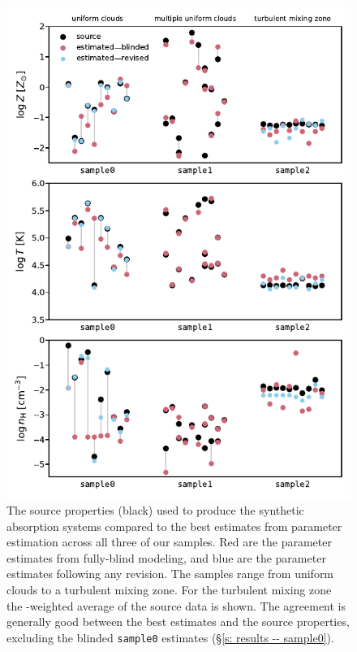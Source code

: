 \documentclass[fleqn,usenatbib]{mnras}
\begin{document}
\begin{figure}
    \centering
    \includegraphics[width=\columnwidth]{figures/averages.pdf}
    \caption{
    The source properties (black) used to produce the synthetic absorption systems
    compared to the best estimates from parameter estimation across all three of our samples.
    Red are the parameter estimates from fully-blind modeling,
    and blue are the parameter estimates following any revision.
    The samples range from uniform clouds to a turbulent mixing zone.
    For the turbulent mixing zone the -weighted average of the source data is shown.
    The agreement is generally good between the best estimates and the source properties,
    excluding the blinded \texttt{sample0} estimates (\S\ref{s: results -- sample0}).
    }
    \label{f: summary--average}
\end{figure}
\end{document}
